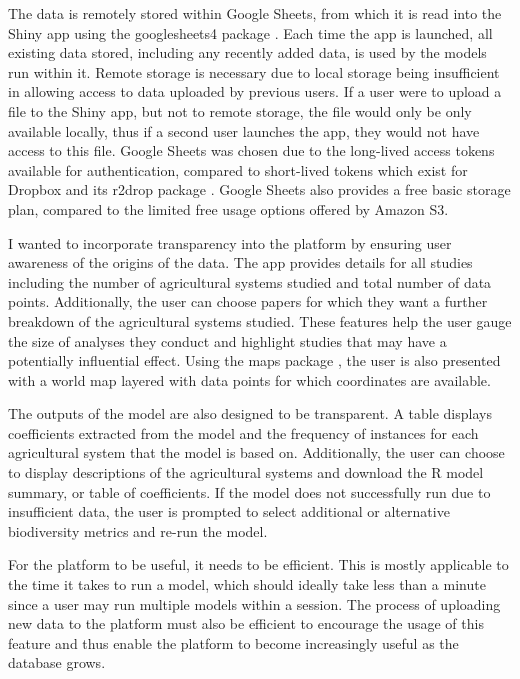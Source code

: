 \documentclass[11pt]{article}
\begin{document}
		\noindent The data is remotely stored within Google Sheets, from which it is read into the Shiny app using the googlesheets4 package \citep{bryan2020googlesheets4}. Each time the app is launched, all existing data stored, including any recently added data, is used by the models run within it. Remote storage is necessary due to local storage being insufficient in allowing access to data uploaded by previous users. If a user were to upload a file to the Shiny app, but not to remote storage, the file would only be only available locally, thus if a second user launches the app, they would not have access to this file. Google Sheets was chosen due to the long-lived access tokens available for authentication, compared to short-lived tokens which exist for Dropbox and its r2drop package \citep{ram2020rdrop2}. Google Sheets also provides a free basic storage plan, compared to the limited free usage options offered by Amazon S3. 
		
		\noindent I wanted to incorporate transparency into the platform by ensuring user awareness of the  origins of the data. The app provides details for all studies including the number of agricultural systems studied and total number of data points. Additionally, the user can choose papers for which they want a further breakdown of the agricultural systems studied. These features help the user gauge the size of analyses they conduct and highlight studies that may have a potentially influential effect. Using the maps package \citep{becker2021maps}, the user is also presented with a world map layered with data points for which coordinates are available.
		
		\noindent The outputs of the model are also designed to be transparent. A table displays coefficients extracted from the model and the frequency of instances for each agricultural system that the model is based on. Additionally, the user can choose to display descriptions of the agricultural systems and download the R model summary, or table of coefficients. If the model does not successfully run due to insufficient data, the user is prompted to select additional or alternative biodiversity metrics and re-run the model.
		
		\noindent For the platform to be useful, it needs to be efficient. This is mostly applicable to the time it takes to run a model, which should ideally take less than a minute since a user may run multiple models within a session. The process of uploading new data to the platform must also be efficient to encourage the usage of this feature and thus enable the platform to become increasingly useful as the database grows.
		
\end{document}
